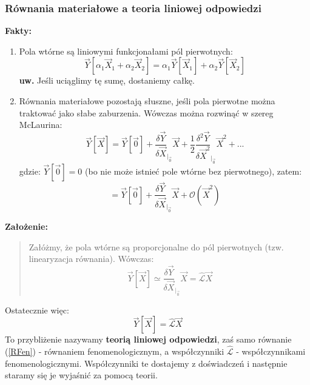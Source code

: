 \subsubsection{Równania materiałowe a teoria liniowej odpowiedzi}
\textbf{Fakty:}
\begin{enumerate}
\item Pola wtórne są liniowymi funkcjonałami pól pierwotnych:
\begin{equation} \vec{Y}[\alpha_1\vec{X}_1 + \alpha_2\vec{X}_2]=\alpha_1 \vec{Y}[\vec{X}_1] + \alpha_2 \vec{Y}[\vec{X}_2] \end{equation}
\textbf{uw.} Jeśli uciąglimy tę sumę, dostaniemy całkę.
\item Równania materiałowe pozostają słuszne, jeśli pola pierwotne można traktować jako słabe zaburzenia. Wówczas można rozwinąć w szereg McLaurina:
\begin{equation}\vec{Y}[\vec{X}]=\vec{Y}[\vec{0}]+ \frac{\delta\vec{Y}}{\delta\vec{X}}_{\Big|_{\vec{0}}}\vec{X} + \frac{1}{2}\frac{\delta^2 \vec{Y}}{\delta\vec{X}^2}_{\Big|_{\vec{0}}}\vec{X}^2 + ...\end{equation}
gdzie: $\vec{Y}[\vec{0}]=0$ (bo nie może istnieć pole wtórne bez pierwotnego), zatem:
\begin{equation}[\vec{X}]=\vec{Y}[\vec{0}]+ \frac{\delta\vec{Y}}{\delta\vec{X}}_{\Big|_{\vec{0}}}\vec{X} + \mathcal{O}(\vec{X}^2)\end{equation}
\end{enumerate}
\textbf{Założenie:}\begin{verse} 
Załóżmy, że pola wtórne są proporcjonalne do pól pierwotnych (tzw. linearyzacja równania). Wówczas:
\begin{equation}\vec{Y}[{\vec{X}}] \simeq \frac{\delta\vec{Y}}{\delta\vec{X}}_{\Big|_{\vec{0}}} \vec{X} = \hat{\mathcal{L}}\vec{X}\end{equation} \end{verse}
Ostatecznie więc:
\begin{equation}\vec{Y}[{\vec{X}}] = \hat{\mathcal{L}}\vec{X} \label{RFen} \end{equation}
To przybliżenie nazywamy \textbf{teorią liniowej odpowiedzi}, zaś samo równanie (\ref{RFen}) - równaniem fenomenologicznym, a współczynniki $\hat{\mathcal{L}}$ - współczynnikami fenomenologicznymi. Współczynniki te dostajemy z doświadczeń i następnie staramy się je wyjaśnić za pomocą teorii.

